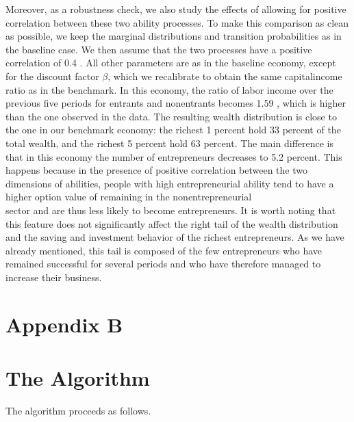 \documentclass[10pt]{article}
\begin{document}
Moreover, as a robustness check, we also study the effects of allowing for positive correlation between these two ability processes. To make this comparison as clean as possible, we keep the marginal distributions and transition probabilities as in the baseline case. We then assume that the two processes have a positive correlation of 0.4 . All other parameters are as in the baseline economy, except for the discount factor $\beta$, which we recalibrate to obtain the same capitalincome ratio as in the benchmark. In this economy, the ratio of labor income over the previous five periods for entrants and nonentrants becomes 1.59 , which is higher than the one observed in the data. The resulting wealth distribution is close to the one in our benchmark economy: the richest 1 percent hold 33 percent of the total wealth, and the richest 5 percent hold 63 percent. The main difference is that in this economy the number of entrepreneurs decreases to 5.2 percent. This happens because in the presence of positive correlation between the two dimensions of abilities, people with high entrepreneurial ability tend to have a higher option value of remaining in the nonentrepreneurial\\
sector and are thus less likely to become entrepreneurs. It is worth noting that this feature does not significantly affect the right tail of the wealth distribution and the saving and investment behavior of the richest entrepreneurs. As we have already mentioned, this tail is composed of the few entrepreneurs who have remained successful for several periods and who have therefore managed to increase their business.

\section*{Appendix B}
\section*{The Algorithm}
The algorithm proceeds as follows.
\end{document}
